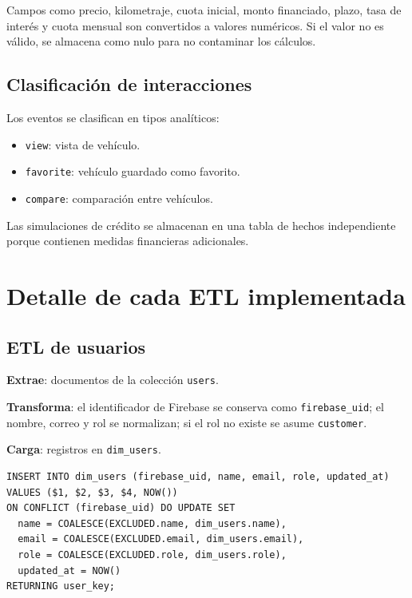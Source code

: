 \documentclass[12pt,letterpaper]{article}
\begin{document}
Campos como precio, kilometraje, cuota inicial, monto financiado, plazo, tasa de interés y cuota mensual son convertidos a valores numéricos. Si el valor no es válido, se almacena como nulo para no contaminar los cálculos.

\subsection{Clasificación de interacciones}

Los eventos se clasifican en tipos analíticos:

\begin{itemize}
    \item \texttt{view}: vista de vehículo.
    \item \texttt{favorite}: vehículo guardado como favorito.
    \item \texttt{compare}: comparación entre vehículos.
\end{itemize}

Las simulaciones de crédito se almacenan en una tabla de hechos independiente porque contienen medidas financieras adicionales.

\section{Detalle de cada ETL implementada}

\subsection{ETL de usuarios}

\textbf{Extrae}: documentos de la colección \texttt{users}.

\textbf{Transforma}: el identificador de Firebase se conserva como \texttt{firebase\_uid}; el nombre, correo y rol se normalizan; si el rol no existe se asume \texttt{customer}.

\textbf{Carga}: registros en \texttt{dim\_users}.

\begin{lstlisting}[style=sqlstyle,caption={Carga de usuarios}]
INSERT INTO dim_users (firebase_uid, name, email, role, updated_at)
VALUES ($1, $2, $3, $4, NOW())
ON CONFLICT (firebase_uid) DO UPDATE SET
  name = COALESCE(EXCLUDED.name, dim_users.name),
  email = COALESCE(EXCLUDED.email, dim_users.email),
  role = COALESCE(EXCLUDED.role, dim_users.role),
  updated_at = NOW()
RETURNING user_key;
\end{lstlisting}
\end{document}
